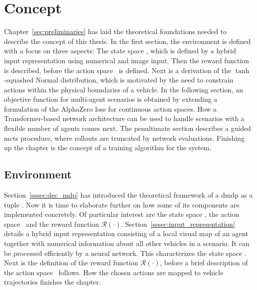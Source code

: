 \glsresetall
\section{Concept}
\label{sec:concept}
Chapter~\ref{sec:preliminaries} has laid the theoretical foundations needed to describe the concept of this thesis. In the first section, the environment is defined with a focus on three aspects: The state space \statespace, which is defined by a hybrid input representation using numerical and image input. Then the reward function is described, before the action space \actionspace\ is defined. Next is a derivation of the $\tanh$-squashed Normal distribution, which is motivated by the need to constrain actions within the physical boundaries of a vehicle. In the following section, an objective function for multi-agent scenarios is obtained by extending a formulation of the AlphaZero loss for continuous action spaces. How a Transformer-based network architecture can be used to handle scenarios with a flexible number of agents comes next. The penultimate section describes a guided \gls{mcts} procedure, where rollouts are truncated by network evaluations. Finishing up the chapter is the concept of a training algorithm for the system.

\subsection{Environment}\label{ssec:environment}
Section~\ref{sssec:dec_mdp} has introduced the theoretical framework of a \gls{dmdp} as a tuple \dmdptuple. Now it is time to elaborate further on how some of its components are implemented concretely. Of particular interest are the state space \statespace, the action space \actionspace\ and the reward function $\mathcal R (\cdot)$. Section~\ref{sssec:input_representation} details a hybrid input representation consisting of a local visual map of an agent together with numerical information about all other vehicles in a scenario. It can be processed efficiently by a neural network. This characterizes the state space \statespace. Next is the definition of the reward function $\mathcal R (\cdot)$, before a brief description of the action space \actionspace\ follows. How the chosen actions are mapped to vehicle trajectories finishes the chapter. 

